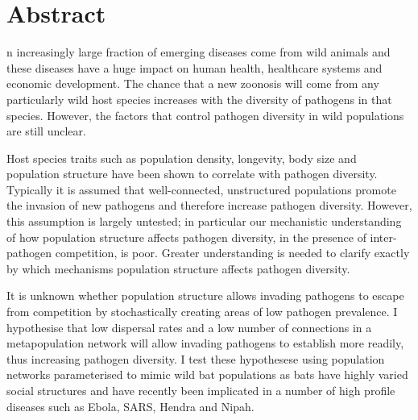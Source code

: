 
\clearpage









\section{Abstract}


n increasingly large fraction of emerging diseases come from wild animals and these diseases have a huge impact on human health, healthcare systems and economic development.
The chance that a new zoonosis will come from any particularly wild host species increases with the diversity of pathogens in that species.
However, the factors that control pathogen diversity in wild populations are still unclear.




Host species traits such as population density, longevity, body size and population structure have been shown to correlate with pathogen diversity.
Typically it is assumed that well-connected, unstructured populations promote the invasion of new pathogens and therefore increase pathogen diversity. %
However, this assumption is largely untested; in particular our mechanistic understanding of how population structure affects pathogen diversity, in the presence of inter-pathogen competition, is poor.
Greater understanding is needed to clarify exactly by which mechanisms population structure affects pathogen diversity. 



It is unknown whether population structure allows invading pathogens to escape from competition by stochastically creating areas of low pathogen prevalence.
I hypothesise that low dispersal rates and a low number of connections in a metapopulation network will allow invading pathogens to establish more readily, thus increasing pathogen diversity. 
I test these hypothesese using population networks parameterised to mimic wild bat populations as bats have highly varied social structures and have recently been implicated in a number of high profile diseases such as Ebola, SARS, Hendra and Nipah.

